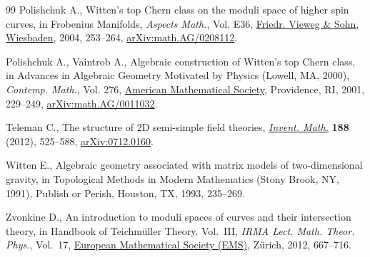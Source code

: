 \documentclass[10pt,a4paper]{amsart}
\numberwithin{equation}{section}
\begin{document}
\begin{thebibliography}{99}
Polishchuk A., Witten's top {C}hern class on the moduli space of higher spin
 curves, in Frobenius {M}anifolds, \textit{Aspects Math.}, Vol. E36, \href{https://doi.org/10.1007/978-3-322-80236-1_10}{Friedr.
 Vieweg \& Sohn, Wiesbaden}, 2004, 253--264, \href{https://arxiv.org/abs/math.AG/0208112}{arXiv:math.AG/0208112}.

Polishchuk A., Vaintrob A., Algebraic construction of {W}itten's top {C}hern
 class, in Advances in {A}lgebraic {G}eometry {M}otivated by {P}hysics
 ({L}owell, {MA}, 2000), \textit{Contemp. Math.}, Vol. 276, \href{https://doi.org/10.1090/conm/276/04523}{American
 Mathematical Society}, Providence, RI, 2001, 229--249,
 \href{https://arxiv.org/abs/math.AG/0011032}{arXiv:math.AG/0011032}.

Teleman C., The structure of 2{D} semi-simple field theories, \href{https://doi.org/10.1007/s00222-011-0352-5}{\textit{Invent.
 Math.}} \textbf{188} (2012), 525--588, \href{https://arxiv.org/abs/0712.0160}{arXiv:0712.0160}.

Witten E., Algebraic geometry associated with matrix models of two-dimensional
 gravity, in Topological {M}ethods in {M}odern {M}athematics ({S}tony {B}rook,
 {NY}, 1991), Publish or Perish, Houston, TX, 1993, 235--269.

Zvonkine D., An introduction to moduli spaces of curves and their intersection
 theory, in Handbook of {T}eichm\"uller {T}heory. {V}ol.~{III}, \textit{IRMA
 Lect. Math. Theor. Phys.}, Vol.~17, \href{https://doi.org/10.4171/103-1/12}{European Mathematical Society (EMS)},
 Z\"urich, 2012, 667--716.

\end{thebibliography}
\end{document}
